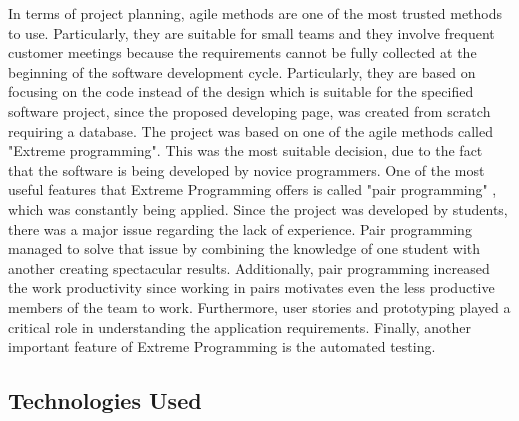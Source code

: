 \documentclass{l3proj}
\begin{document}
In terms of project planning, agile methods are one of the most trusted methods to use. Particularly, they are suitable for small teams and they involve frequent customer meetings because the requirements cannot be fully collected at the beginning of the software development cycle. Particularly, they are based on focusing on the code instead of the design which is suitable for the specified software project, since the proposed developing page, was created from scratch requiring a database. The project was based on one of the agile methods called "Extreme programming". This was the most suitable decision, due to the fact that the software is being developed by novice programmers. One of the most useful features that Extreme Programming offers is called "pair programming" , which was constantly being applied. Since the project was developed by students, there was a major issue regarding the lack of experience. Pair programming managed to solve that issue by combining the knowledge of one student with another creating spectacular results. Additionally, pair programming increased the work productivity since working in pairs motivates even the less productive members of the team to work. Furthermore, user stories and prototyping played a critical role in understanding the application requirements. Finally, another important feature of Extreme Programming is the automated testing.

\subsection{Technologies Used}
\label{tech}
\end{document}
